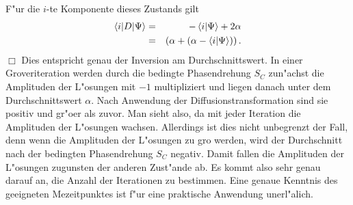           F"ur die $i$-te Komponente dieses Zustands gilt 
          \begin{eqnarray*} 
            \left<i|D|\Psi\right> & = & -\left<i|\Psi\right> + 2\alpha \\  
                                 & = & \left( \alpha + \left( \alpha - \left<i|\Psi\right>\right)\right) . 
          \end{eqnarray*} 
          \hfill $\Box$
          Dies entspricht genau der Inversion am Durchschnittswert. In einer Groveriteration werden durch die bedingte Phasendrehung $S_C$ zun"achst  
          die Amplituden der L"osungen mit $-1$ multipliziert und liegen danach unter dem Durchschnittswert $\alpha$. Nach Anwendung der  
          Diffusionstransformation sind sie positiv und gr"o\3er als zuvor. Man sieht also, da\3 mit jeder Iteration die Amplituden der L"osungen  
          wachsen. Allerdings ist dies nicht unbegrenzt der Fall, denn wenn die Amplituden der L"osungen zu gro\3 werden, wird der Durchschnitt nach  
          der bedingten Phasendrehung $S_C$ negativ. Damit fallen die Amplituden der L"osungen zugunsten der anderen Zust"ande ab. Es kommt also sehr 
          genau darauf an, die Anzahl der Iterationen zu bestimmen. Eine genaue Kenntnis des geeigneten Me\3zeitpunktes ist f"ur eine  
          praktische Anwendung unerl"a\3lich. 

